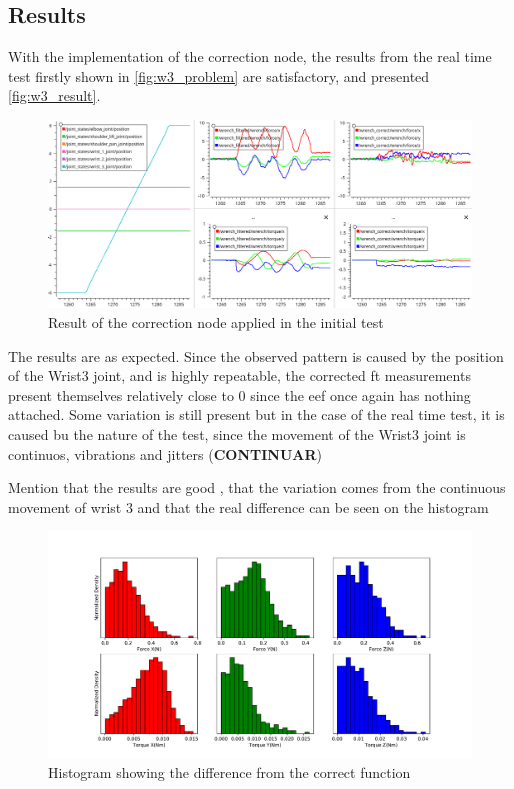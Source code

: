 
\subsection{Results}

\par With the implementation of the correction node, the results from the real time test firstly shown in \autoref{fig:w3_problem} are satisfactory, and presented \autoref{fig:w3_result}.

\begin{figure}[h]
    \centering
    \includegraphics[width=0.9\linewidth]{figs/chp3/wrist_3_result.png}
    \caption{Result of the correction node applied in the initial test}
    \label{fig:w3_result}
\end{figure}

\par The results are as expected. Since the observed pattern is caused by the position of the Wrist3 joint, and is highly repeatable, the corrected \ac{ft} measurements present themselves relatively close to 0 since the \ac{eef} once again has nothing attached. Some variation is still present but in the case of the real time test, it is caused bu the nature of the test, since the movement of the Wrist3 joint is continuos, vibrations and jitters (\textbf{CONTINUAR})

\par Mention that the results are good , that the variation comes from the continuous movement of wrist 3 and that the real difference can be seen on the histogram


\begin{figure}[h]
    \centering
    \includegraphics[width=\linewidth]{figs/chp3/wrist_3_result_hist.pdf}
    \caption{Histogram showing the difference from the correct function}
    \label{fig:w3_result_hist}
\end{figure}


